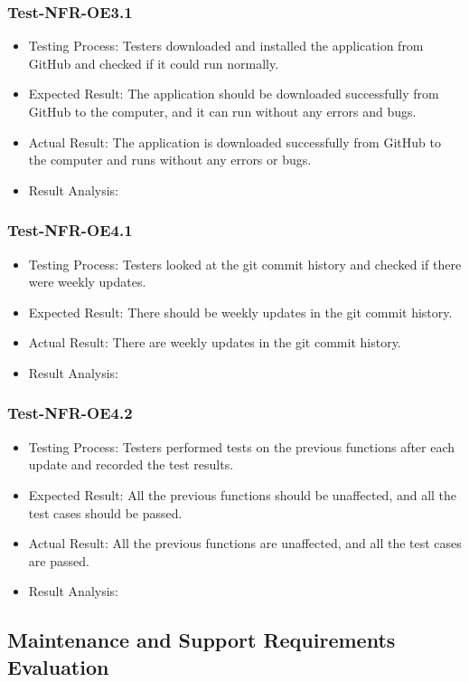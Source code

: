 \documentclass[12pt, titlepage]{article}
\begin{document}
\subsubsection{Test-NFR-OE3.1}
\begin{itemize}
    \item Testing Process: Testers downloaded and installed the application from GitHub and checked if it could run normally.
    \item Expected Result: The application should be downloaded successfully from GitHub to the computer, and it can run without any errors and bugs.
    \item Actual Result: The application is downloaded successfully from GitHub to the computer and runs without any errors or bugs.
    \item Result Analysis: \pass
\end{itemize}
\subsubsection{Test-NFR-OE4.1}
\begin{itemize}
    \item Testing Process: Testers looked at the git commit history and checked if there were weekly updates.
    \item Expected Result: There should be weekly updates in the git commit history.
    \item Actual Result: There are weekly updates in the git commit history.
    \item Result Analysis: \pass
\end{itemize}
\subsubsection{Test-NFR-OE4.2}
\begin{itemize}
    \item Testing Process: Testers performed tests on the previous functions after each update and recorded the test results.
    \item Expected Result: All the previous functions should be unaffected, and all the test cases should be passed.
    \item Actual Result: All the previous functions are unaffected, and all the test cases are passed.
    \item Result Analysis: \pass
\end{itemize}

\subsection{Maintenance and Support Requirements Evaluation}
\end{document}
